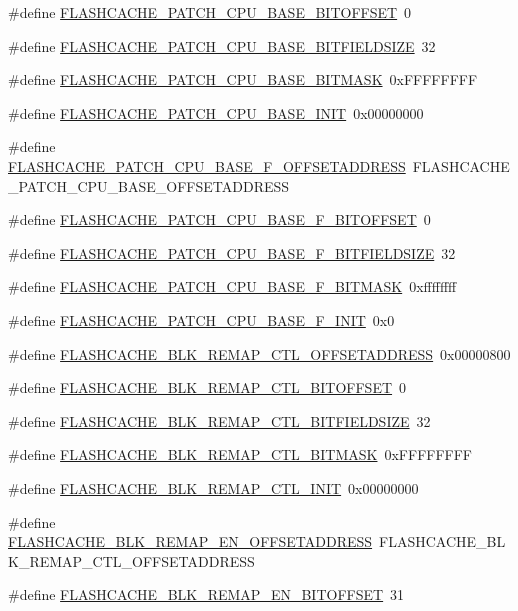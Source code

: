 \begin{DoxyCompactItemize}
\#define \hyperlink{a00550_a7efecae59b8eb13b48e0db0c0055c797}{FLASHCACHE\_\-PATCH\_\-CPU\_\-BASE\_\-BITOFFSET}~0
\item 
\#define \hyperlink{a00550_ad8da0544af6e47653a702dfd0668caac}{FLASHCACHE\_\-PATCH\_\-CPU\_\-BASE\_\-BITFIELDSIZE}~32
\item 
\#define \hyperlink{a00550_a427e356408d90e2cb68b65b2000b09e5}{FLASHCACHE\_\-PATCH\_\-CPU\_\-BASE\_\-BITMASK}~0xFFFFFFFF
\item 
\#define \hyperlink{a00550_a7935012c15fa8900cba2363ca6518e12}{FLASHCACHE\_\-PATCH\_\-CPU\_\-BASE\_\-INIT}~0x00000000
\item 
\#define \hyperlink{a00550_a3cc1a08077ac10e2135b0921be86ddaf}{FLASHCACHE\_\-PATCH\_\-CPU\_\-BASE\_\-F\_\-OFFSETADDRESS}~FLASHCACHE\_\-PATCH\_\-CPU\_\-BASE\_\-OFFSETADDRESS
\item 
\#define \hyperlink{a00550_ad97f2f49fcd1718803818035b7246ea8}{FLASHCACHE\_\-PATCH\_\-CPU\_\-BASE\_\-F\_\-BITOFFSET}~0
\item 
\#define \hyperlink{a00550_ab0705b7fc1dae907d6c26aacc2c984ad}{FLASHCACHE\_\-PATCH\_\-CPU\_\-BASE\_\-F\_\-BITFIELDSIZE}~32
\item 
\#define \hyperlink{a00550_a355c1e4806e462049de3b64e2196b380}{FLASHCACHE\_\-PATCH\_\-CPU\_\-BASE\_\-F\_\-BITMASK}~0xffffffff
\item 
\#define \hyperlink{a00550_a1536055993023aa26d23d70bc7cb1eae}{FLASHCACHE\_\-PATCH\_\-CPU\_\-BASE\_\-F\_\-INIT}~0x0
\item 
\#define \hyperlink{a00550_a2f6c9755ab0c11c03d0120f430e1ddfb}{FLASHCACHE\_\-BLK\_\-REMAP\_\-CTL\_\-OFFSETADDRESS}~0x00000800
\item 
\#define \hyperlink{a00550_aaff4ac960f3a31625a2c8a9a29bb166b}{FLASHCACHE\_\-BLK\_\-REMAP\_\-CTL\_\-BITOFFSET}~0
\item 
\#define \hyperlink{a00550_ae02b2fb3ec805522e03d3c9785a58621}{FLASHCACHE\_\-BLK\_\-REMAP\_\-CTL\_\-BITFIELDSIZE}~32
\item 
\#define \hyperlink{a00550_af4482052beda3ebca16d20e3ba86225c}{FLASHCACHE\_\-BLK\_\-REMAP\_\-CTL\_\-BITMASK}~0xFFFFFFFF
\item 
\#define \hyperlink{a00550_abf15b5fa23e216ab5c1c6e587889bf2a}{FLASHCACHE\_\-BLK\_\-REMAP\_\-CTL\_\-INIT}~0x00000000
\item 
\#define \hyperlink{a00550_a4ec8e07e0713510772a2af8bc690906d}{FLASHCACHE\_\-BLK\_\-REMAP\_\-EN\_\-OFFSETADDRESS}~FLASHCACHE\_\-BLK\_\-REMAP\_\-CTL\_\-OFFSETADDRESS
\item 
\#define \hyperlink{a00550_ae664cc9649985fb51b2d530223573fdc}{FLASHCACHE\_\-BLK\_\-REMAP\_\-EN\_\-BITOFFSET}~31

\end{DoxyCompactItemize}
